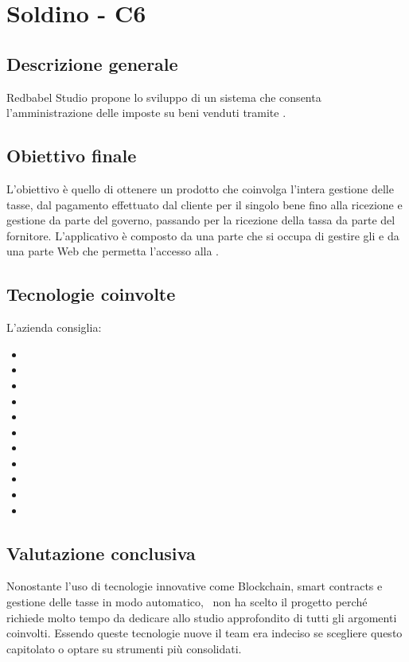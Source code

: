 \section{Soldino - C6} \label{c6}
    \subsection{Descrizione generale}
    Redbabel Studio propone lo sviluppo di un sistema che consenta l'amministrazione delle  imposte su beni venduti tramite .
    \subsection{Obiettivo finale}

    L'obiettivo è quello di ottenere un prodotto che coinvolga l'intera gestione delle tasse, dal pagamento effettuato dal cliente per il singolo bene
    fino alla ricezione e gestione da parte del governo, passando per la ricezione della tassa da parte del fornitore.
    L'applicativo è composto da una parte che si occupa di gestire gli  e da una parte Web che permetta l'accesso alla .

    \subsection{Tecnologie coinvolte}
	L'azienda consiglia:
    	\begin{itemize}
        \item {}
		\item {}
        \item {}
		\item {}
		\item {}
		\item {}
		\item {}
        \item {}
        \item {}
        \item {}
        \item {}
	\end{itemize}

    \subsection{Valutazione conclusiva}
    Nonostante l'uso di tecnologie innovative come Blockchain, smart contracts e gestione delle tasse in modo automatico, \gruppo\ non ha scelto
    il progetto perché richiede molto tempo da dedicare allo studio approfondito di tutti gli argomenti coinvolti.
    Essendo queste tecnologie nuove il team era indeciso se scegliere questo capitolato o optare su strumenti più consolidati.
